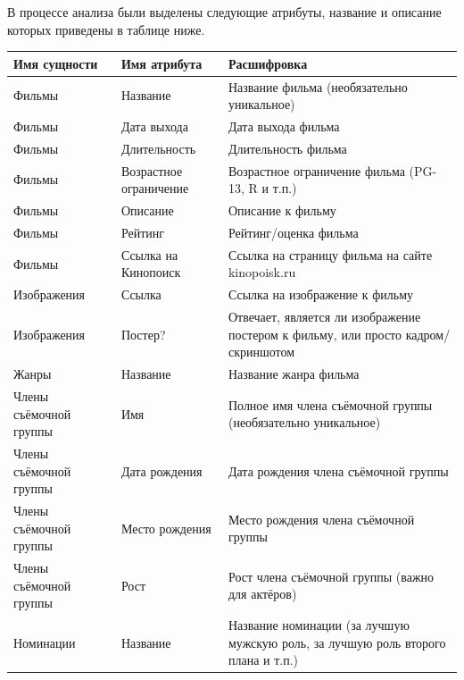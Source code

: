 \documentclass[a4paper,12pt]{article}
\renewcommand{\^}[2]{#1^{\, #2} \kern -1pt}
\newcommand{\1}{\kern 1pt}
\newcommand{\0}{\kern -1pt}
\begin{document}
	В процессе анализа были выделены следующие атрибуты, название и описание которых приведены в таблице ниже.
	
	\begin{center}
		\begin{tabular}{|p{4cm}|p{4cm}|p{7cm}|}
			\hline
			\textbf{Имя сущности}	& \textbf{Имя атрибута} 	& \textbf{Расшифровка}	\\ \hline
			Фильмы	& Название	& Название фильма (необязательно уникальное)	\\ \hline
			Фильмы	& Дата выхода	& Дата выхода фильма	\\ \hline
			Фильмы	& Длительность	& Длительность фильма	\\ \hline
			Фильмы	& Возрастное ограничение	& Возрастное ограничение фильма (PG-13, R и т.п.)	\\ \hline
			Фильмы	& Описание	& Описание к фильму	\\ \hline
			Фильмы	& Рейтинг	& Рейтинг/оценка фильма	\\ \hline
			Фильмы	& Ссылка на Кинопоиск	& Ссылка на страницу фильма на сайте kinopoisk.ru	\\ \hline
			Изображения	& Ссылка	& Ссылка на изображение к фильму	\\ \hline
			Изображения	& Постер?	& Отвечает, является ли изображение постером к фильму, или просто кадром/скриншотом	\\ \hline
			Жанры	& Название	& Название жанра фильма	\\ \hline
			Члены съёмочной группы	& Имя	& Полное имя члена съёмочной группы (необязательно уникальное)	\\ \hline
			Члены съёмочной группы	& Дата рождения	& Дата рождения члена съёмочной группы	\\ \hline
			Члены съёмочной группы	& Место рождения	& Место рождения члена съёмочной группы	\\ \hline
			Члены съёмочной группы	& Рост	& Рост члена съёмочной группы (важно для актёров)	\\ \hline
			Номинации	& Название	& Название номинации (за лучшую мужскую роль, за лучшую роль второго плана и т.п.)	\\ \hline
		\end{tabular}
	\end{center}
\end{document}

